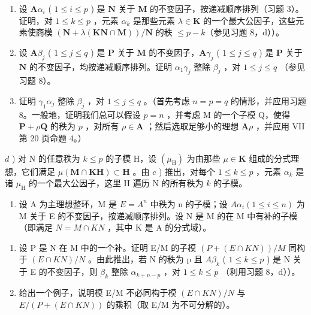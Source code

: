 \begin{enumerate}
\def\labelenumi{\alph{enumi})}
\item
  设 \(\mathbf{A}\alpha_{i}\) ( \(1 \leqslant i \leqslant p\) ) 是 \(\mathbf{N}\) 关于 \(\mathbf{M}\) 的不变因子，按递减顺序排列（习题 3）。证明，对 \(1 \leqslant k \leqslant p\) ，元素 \(\alpha_{k}\) 是那些元素 \(\lambda \in \mathbf{K}\) 的一个最大公因子，这些元素使商模 \((\mathbf{N} + \lambda (\mathbf{KN} \cap \mathbf{M})) / \mathbf{N}\) 的秩 \(\leqslant p - k\)（参见习题 8，d））。
\item
  设 \(\mathbf{A}\beta_{j}\) ( \(1 \leqslant j \leqslant q\) ) 是 \(\mathbf{P}\) 关于 \(\mathbf{M}\) 的不变因子，\(\mathbf{A}\gamma_{j}\) ( \(1 \leqslant j \leqslant q\) ) 是 \(\mathbf{P}\) 关于 \(\mathbf{N}\) 的不变因子，均按递减顺序排列。证明 \(\alpha_{1}\gamma_{j}\) 整除 \(\beta_{j}\) ，对 \(1 \leqslant j \leqslant q\) （参见习题 8）。
\item
  证明 \(\gamma_{1}\alpha_{j}\) 整除 \(\beta_{j}\) ，对 \(1 \leqslant j \leqslant q\) 。（首先考虑 \(n = p = q\) 的情形，并应用习题 8。一般地，证明我们总可以假设 \(p = n\) ，并考虑 M 的一个子模 Q，使得 \(\mathbf{P} + \rho \mathbf{Q}\) 的秩为 \(p\) ，对所有 \(\rho \in \mathbf{A}\) ；然后选取足够小的理想 \(\mathbf{A}\rho\) ，并应用 VII 第 20 页命题 4。）
\end{enumerate}

\(d\) ) 对 N 的任意秩为 \(k \leqslant p\) 的子模 H，设 \((\mu_{\mathrm{H}})\) 为由那些 \(\mu \in \mathbf{K}\) 组成的分式理想，它们满足 \(\mu (\mathbf{M} \cap \mathbf{KH}) \subset \mathbf{H}\) 。由 \(c\) ) 推出，对每个 \(1 \leqslant k \leqslant p\) ，元素 \(\alpha_{k}\) 是诸 \(\mu_{\mathrm{H}}\) 的一个最大公因子，这里 H 遍历 N 的所有秩为 \(k\) 的子模。

\begin{enumerate}
\def\labelenumi{\arabic{enumi})}
\setcounter{enumi}{9}
\tightlist
\item
  设 A 为主理想整环，M 是 \(E = A^{n}\) 中秩为 n 的子模；设 \(A\alpha_{i} (1 \leqslant i \leqslant n)\) 为 M 关于 E 的不变因子，按递减顺序排列。设 N 是 M 的在 M 中有补的子模（即满足 \(N = M \cap KN\) ，其中 K 是 A 的分式域）。
\end{enumerate}

\begin{enumerate}
\def\labelenumi{\alph{enumi})}
\item
  设 P 是 N 在 M 中的一个补。证明 E/M 的子模 \((P + (E \cap KN))/M\) 同构于 \((E \cap KN)/N\) 。由此推出，若 N 的秩为 p 且 \(A\beta_{k}\) ( \(1 \leqslant k \leqslant p\) ) 是 N 关于 E 的不变因子，则 \(\beta_{k}\) 整除 \(\alpha_{k+n-p}\) ，对 \(1 \leqslant k \leqslant p\) （利用习题 8，d））。
\item
  给出一个例子，说明模 E/M 不必同构于模 \((E \cap KN)/N\) 与 \(E/(P + (E \cap KN))\) 的乘积（取 E/M 为不可分解的）。
\end{enumerate}

